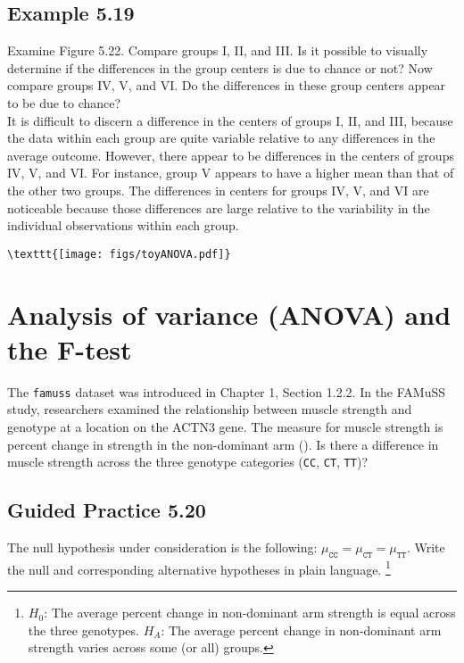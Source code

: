 \documentclass[
  letterpaper,
  DIV=11,
  numbers=noendperiod]{scrreprt}
\begin{document}
\hypertarget{example-5.19}{%
\subsection{Example 5.19}\label{example-5.19}}

Examine Figure 5.22. Compare groups I, II, and III. Is it possible to
visually determine if the differences in the group centers is due to
chance or not? Now compare groups IV, V, and VI. Do the differences in
these group centers appear to be due to chance?\\
It is difficult to discern a difference in the centers of groups I, II,
and III, because the data within each group are quite variable relative
to any differences in the average outcome. However, there appear to be
differences in the centers of groups IV, V, and VI. For instance, group
V appears to have a higher mean than that of the other two groups. The
differences in centers for groups IV, V, and VI are noticeable because
those differences are large relative to the variability in the
individual observations within each group.

\begin{verbatim}
\texttt{[image: figs/toyANOVA.pdf]}
\end{verbatim}

\hypertarget{analysis-of-variance-anova-and-the-pmbf-test}{%
\section{\texorpdfstring{Analysis of variance (ANOVA) and the
\(\pmb{F}\)-test}{Analysis of variance (ANOVA) and the \textbackslash pmb\{F\}-test}}\label{analysis-of-variance-anova-and-the-pmbf-test}}

The \texttt{famuss} dataset was introduced in Chapter 1, Section 1.2.2.
In the FAMuSS study, researchers examined the relationship between
muscle strength and genotype at a location on the ACTN3 gene. The
measure for muscle strength is percent change in strength in the
non-dominant arm (). Is there a difference in muscle
strength across the three genotype categories (\texttt{CC}, \texttt{CT},
\texttt{TT})?

\hypertarget{guided-practice-5.20}{%
\subsection{Guided Practice 5.20}\label{guided-practice-5.20}}

The null hypothesis under consideration is the following:
\(\mu_{\texttt{CC}} = \mu_{\texttt{CT}} = \mu_{\texttt{TT}}\). Write the
null and corresponding alternative hypotheses in plain language.
\footnote{\(H_0\): The average percent change in non-dominant arm
  strength is equal across the three genotypes. \(H_A\): The average
  percent change in non-dominant arm strength varies across some (or
  all) groups.}
\end{document}
